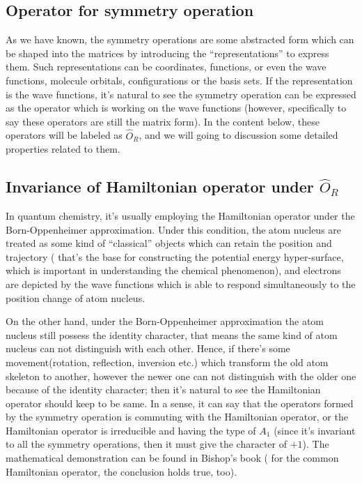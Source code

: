 \subsection{Operator for symmetry operation}
%
%
As we have known, the symmetry operations are some abstracted form
which can be shaped into the matrices by introducing the
``representations'' to express them. Such representations can be
coordinates, functions, or even the wave functions, molecule orbitals,
configurations or the basis sets. If the representation is the wave
functions, it's natural to see the symmetry operation can be expressed
as the operator which is working on the wave functions (however,
specifically to say these operators are still the matrix form). In the
content below, these operators will be labeled as $\hat{O}_{R}$, and
we will going to discussion some detailed properties related to them.

\subsection{Invariance of Hamiltonian operator under $\hat{O}_{R}$}
%
%  
%
In quantum chemistry, it's usually employing the Hamiltonian operator
under the Born-Oppenheimer approximation. Under this condition, the
atom nucleus are treated as some kind of ``classical'' objects which
can retain the position and trajectory ( that's the base for
constructing the potential energy hyper-surface, which is important in
understanding the chemical phenomenon), and electrons are depicted by
the wave functions which is able to respond simultaneously to the
position change of atom nucleus.

On the other hand, under the Born-Oppenheimer approximation the atom
nucleus still possess the identity character, that means the same kind
of atom nucleus can not distinguish with each other. Hence, if there's
some movement(rotation, reflection, inversion etc.) which transform
the old atom skeleton to another, however the newer one can not
distinguish with the older one because of the identity character; then
it's natural to see the Hamiltonian operator should keep to be
same. In a sense, it can say that the operators formed by the symmetry
operation is commuting with the Hamiltonian operator, or the
Hamiltonian operator is irreducible and having the type of $A_{1}$ (since
it's invariant to all the symmetry operations, then it must give the
character of $+1$). The mathematical demonstration can be found in
Bishop's book\cite{Bishop} ( for the common Hamiltonian operator, the
conclusion holds true, too).

